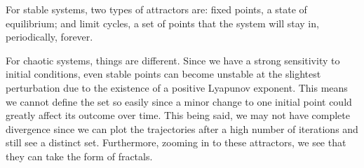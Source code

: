 For stable systems, two types of attractors are: fixed points, a state of equilibrium; and limit cycles, a set of points that the system will stay in, periodically, forever. 

For chaotic systems, things are different. Since we have a strong sensitivity to initial conditions, even stable points can become unstable at the slightest perturbation due to the existence of a positive Lyapunov exponent. This means we cannot define the set so easily since a minor change to one initial point could greatly affect its outcome over time. This being said, we may not have complete divergence since we can plot the trajectories after a high number of iterations and still see a distinct set. Furthermore, zooming in to these attractors, we see that they can take the form of fractals. 

